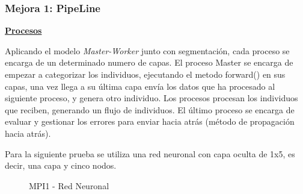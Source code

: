 		\subsubsection{Mejora 1: PipeLine}
		
			\begin{flushleft}			
				\begin{mdframed}[roundcorner=5pt]
					\textbf{\underline{Procesos}}
					\vspace{0.1cm}
					
					\scriptsize		
					Aplicando el modelo \textit{Master-Worker} junto con segmentación, cada proceso se encarga de un determinado numero de capas. El proceso Master se encarga de empezar a categorizar los individuos, ejecutando el metodo forward() en sus capas, una vez llega a su última capa envía los datos que ha procesado al siguiente proceso, y genera otro individuo. Los procesos procesan los individuos que reciben, generando un flujo de individuos. El último proceso se encarga de evaluar y gestionar los errores para enviar hacia atrás (método de propagación hacia atrás).
				\end{mdframed}
			\end{flushleft}
		
		
		
			\begin{tcolorbox}[boxrule=0.5pt]
				\scriptsize
				Para la siguiente prueba se utiliza una red neuronal con capa oculta de 1x5, es decir, una capa y cinco nodos.		
			\end{tcolorbox}



			\begin{figure}[!h]
				\centering
				\caption{MPI1 - Red Neuronal}
			\end{figure}

